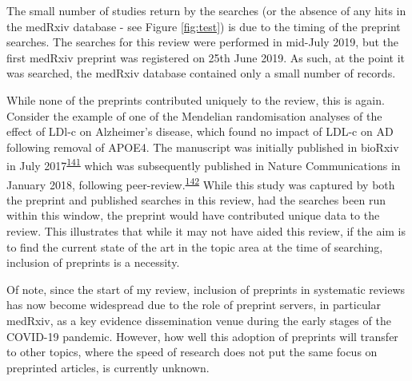 \documentclass[a4paper, twoside]{templates/ociamthesis}
\begin{document}
The small number of studies return by the searches (or the absence of any hits in the medRxiv database - see Figure \ref{fig:test}) is due to the timing of the preprint searches. The searches for this review were performed in mid-July 2019, but the first medRxiv preprint was registered on 25th June 2019. As such, at the point it was searched, the medRxiv database contained only a small number of records.

While none of the preprints contributed uniquely to the review, this is again. Consider the example of one of the Mendelian randomisation analyses of the effect of LDl-c on Alzheimer's disease, which found no impact of LDL-c on AD following removal of APOE4. The manuscript was initially published in bioRxiv in July 2017\textsuperscript{\protect\hyperlink{ref-zhu2017}{141}} which was subsequently published in Nature Communications in January 2018, following peer-review.\textsuperscript{\protect\hyperlink{ref-zhu2018}{142}} While this study was captured by both the preprint and published searches in this review, had the searches been run within this window, the preprint would have contributed unique data to the review. This illustrates that while it may not have aided this review, if the aim is to find the current state of the art in the topic area at the time of searching, inclusion of preprints is a necessity.

Of note, since the start of my review, inclusion of preprints in systematic reviews has now become widespread due to the role of preprint servers, in particular medRxiv, as a key evidence dissemination venue during the early stages of the COVID-19 pandemic. However, how well this adoption of preprints will transfer to other topics, where the speed of research does not put the same focus on preprinted articles, is currently unknown.
\end{document}

